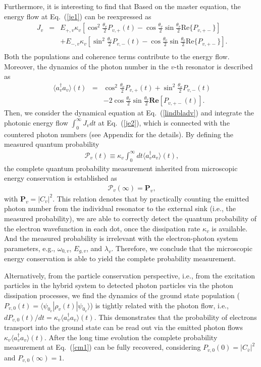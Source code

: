 \documentclass[twocolumn,showpacs,preprintnumbers,amsmath,amssymb]{revtex4}
\begin{document}
	
	Furthermore, it is interesting to find that
	Based on the master equation, the energy flow
	at Eq.~(\ref{je1}) can be reexpressed as
	\begin{eqnarray}~\label{je2}
		J_v&=&E_{+,v}\kappa_v[\cos^2\frac{\theta_v}{2}P_{v,+}(t)
		-\cos\frac{\theta_v}{2}\sin\frac{\theta_v}{2}\textrm{Re}\{P_{v,+-}\}]\nonumber\\
		&&+E_{-,v}\kappa_v[\sin^2\frac{\theta_v}{2}P_{v,-}(t)
		-\cos\frac{\theta_v}{2}\sin\frac{\theta_v}{2}\textrm{Re}\{P_{v,+-}\}].\nonumber\\
	\end{eqnarray}
	Both the populations
	and coherence terms contribute to the energy flow.
	Moreover, the dynamics of the photon number in the $v$-th resonator is described as
	\begin{eqnarray}~\label{nt1}
		\langle a^\dagger_v a_v\rangle(t) &=&\cos^2{\frac{\theta_v}{2}} P_{v,+}(t) + \sin^2{\frac{\theta_v}{2}}P_{v,-}(t)\\
		&&-2\cos{\frac{\theta_v}{2}}\sin{\frac{\theta_v}{2}}\textbf{Re}[P_{v,+-}(t)].\nonumber
	\end{eqnarray}
	Then, we consider the dynamical equation at Eq.~(\ref{lindbladv})
	and integrate the photonic energy flow $\int^\infty_0J_vdt$ at Eq.~(\ref{je2}), which is connected with the countered photon numbers (see Appendix for the details).
By defining the measured quantum probability
\begin{eqnarray}~\label{mqp1}
\mathscr{P}_v(t) {\equiv} \kappa_v\int ^{\infty}_{0}dt\langle a^\dagger_v a_v\rangle(t),
\end{eqnarray}
 the complete quantum probability measurement inherited from microscopic energy conservation is established as
	\begin{eqnarray}~\label{cm1}
		\mathscr{P}_v(\infty)=\mathbf{P}_v,
	\end{eqnarray}
with $\mathbf{P}_v=|C_v|^2$.
	This relation denotes that by practically counting the emitted photon number from the individual resonator to the external sink (i.e., the measured probability), we are able to correctly detect the quantum probability of the electron wavefunction in each dot,
	once the dissipation rate $\kappa_v$ is available.
	And the measured probability is irrelevant with the electron-photon system parameters, e.g., $\omega_{0,v}$, $E_{g,v}$,
	and $\lambda_v$.
	Therefore, we conclude that the microscopic energy conservation is able to yield the complete probability measurement.
	
	
	Alternatively, from the particle conservation perspective,
i.e., from the excitation particles in the hybrid system to detected photon particles via the photon dissipation processes, we find the dynamics of the ground state population
	($P_{v,0}(t)={\langle}\psi_{0_v}|\rho_v(t)|\psi_{0_v}{\rangle}$) is tightly related with the photon flow, i.e.,
	${dP_{v,0}(t)}/{dt}=\kappa_v\langle a^\dagger_v a_v\rangle(t)$.
	This demonstrates that the probability of electrons transport into the ground state  can be read out via  the emitted photon flows
	$\kappa_v\langle a^\dagger_v a_v\rangle(t)$.
	After the long time evolution the complete probability measurement at Eq.~(\ref{cm1}) can be fully
	recovered,
	considering $P_{v,0}(0)=|C_{\overline{v}}|^2$ and $P_{v,0}(\infty)=1$.
	
\end{document}
